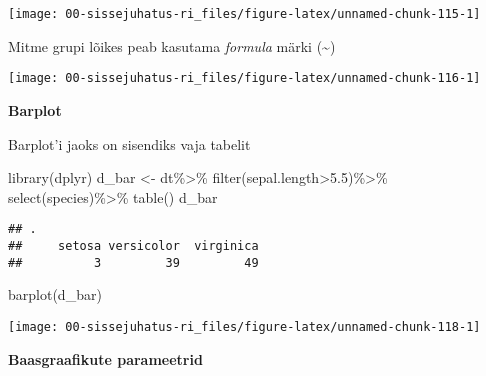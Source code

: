 \documentclass[
]{book}
\newenvironment{Shaded}{\begin{snugshade}}{\end{snugshade}}
\newcommand{\FloatTok}[1]{\textcolor[rgb]{0.00,0.00,0.81}{#1}}
\newcommand{\FunctionTok}[1]{\textcolor[rgb]{0.00,0.00,0.00}{#1}}
\newcommand{\NormalTok}[1]{#1}
\newcommand{\OtherTok}[1]{\textcolor[rgb]{0.56,0.35,0.01}{#1}}
\newcommand{\SpecialCharTok}[1]{\textcolor[rgb]{0.00,0.00,0.00}{#1}}
\begin{document}
\begin{center}\texttt{[image: 00-sissejuhatus-ri\_files/figure-latex/unnamed-chunk-115-1]} \end{center}

Mitme grupi lõikes peab kasutama \emph{formula} märki (\textasciitilde)

\begin{Shaded}
\end{Shaded}

\begin{center}\texttt{[image: 00-sissejuhatus-ri\_files/figure-latex/unnamed-chunk-116-1]} \end{center}

\textbf{Barplot}

Barplot'i jaoks on sisendiks vaja tabelit

\begin{Shaded}
\begin{Highlighting}[]
\FunctionTok{library}\NormalTok{(dplyr)}
\NormalTok{d\_bar }\OtherTok{\textless{}{-}}\NormalTok{ dt}\SpecialCharTok{\%\textgreater{}\%}
  \FunctionTok{filter}\NormalTok{(sepal.length}\SpecialCharTok{\textgreater{}}\FloatTok{5.5}\NormalTok{)}\SpecialCharTok{\%\textgreater{}\%}
  \FunctionTok{select}\NormalTok{(species)}\SpecialCharTok{\%\textgreater{}\%}
  \FunctionTok{table}\NormalTok{()}
\NormalTok{d\_bar}
\end{Highlighting}
\end{Shaded}

\begin{verbatim}
## .
##     setosa versicolor  virginica 
##          3         39         49
\end{verbatim}

\begin{Shaded}
\begin{Highlighting}[]
\FunctionTok{barplot}\NormalTok{(d\_bar)}
\end{Highlighting}
\end{Shaded}

\begin{center}\texttt{[image: 00-sissejuhatus-ri\_files/figure-latex/unnamed-chunk-118-1]} \end{center}

\textbf{Baasgraafikute parameetrid}
\end{document}
